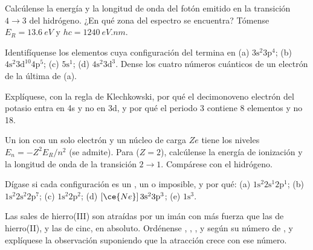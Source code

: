 \begin{exercise}[$\star\star$]\label{exo:b1:quantum-numbers:7}
Calcúlense la energía y la longitud de onda del fotón emitido en la
transición $4 \to 3$ del hidrógeno. ¿En qué zona del espectro se
encuentra? Tómense $E_R = \qty{13.6}{eV}$ y $hc = \qty{1240}{eV.nm}$.
\end{exercise}

\begin{exercise}[$\star\star$]\label{exo:b1:quantum-numbers:8}
Identifíquense los elementos cuya configuración del 
termina en
(a) $3\text{s}^2 3\text{p}^4$; (b) $4\text{s}^2 3\text{d}^{10} 4\text{p}^5$;
(c) $5\text{s}^1$; (d) $4\text{s}^2 3\text{d}^3$. Dense los cuatro
números cuánticos de un electrón de la última  de (a).
\end{exercise}

\begin{exercise}[$\star\star$]\label{exo:b1:quantum-numbers:9}
Explíquese, con la regla de Klechkowski, por qué el decimonoveno electrón
del potasio entra en 4s y no en 3d, y por qué el periodo 3 contiene 8
elementos y no 18.
\end{exercise}

\begin{exercise}[$\star\star\star$]\label{exo:b1:quantum-numbers:10}
Un ion con un solo electrón y un núcleo de carga $Ze$ tiene los niveles
$E_n = -Z^2 E_R/n^2$ (se admite). Para  ($Z = 2$), calcúlense la
energía de ionización y la longitud de onda de la transición $2 \to 1$.
Compárese con el hidrógeno.
\end{exercise}

\begin{exercise}[$\star\star\star$]\label{exo:b1:quantum-numbers:11}
Dígase si cada configuración es un , un 
o imposible, y por qué: (a) $1\text{s}^2 2\text{s}^1 2\text{p}^1$;
(b) $1\text{s}^2 2\text{s}^2 2\text{p}^7$; (c) $1\text{s}^2 2\text{p}^2$;
(d) $[\ce{Ne}]\,3\text{s}^2 3\text{p}^3$; (e) $1\text{s}^3$.
\end{exercise}

\begin{exercise}[$\star\star\star$]\label{exo:b1:quantum-numbers:12}
Las sales de hierro(III) son atraídas por un imán con más fuerza que las
de hierro(II), y las de cinc, en absoluto. Ordénense ,
, ,  y  según su número
de , y explíquese la observación suponiendo que la
atracción crece con ese número.
\end{exercise}

